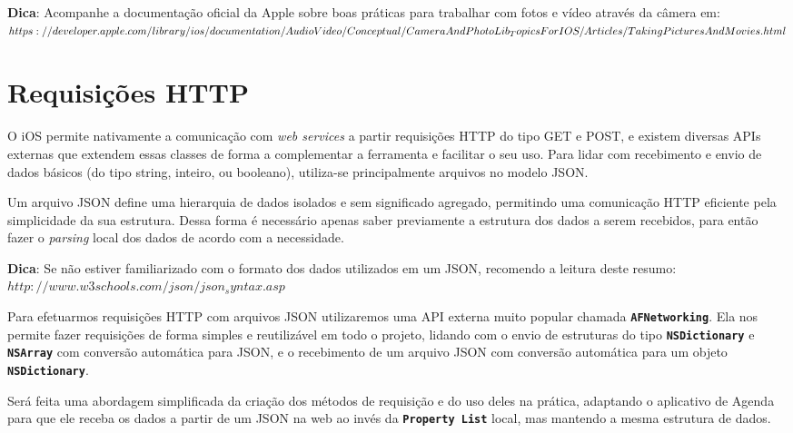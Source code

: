 \documentclass[a4paper,12pt,brazil,oneside]{book}
\begin{document}
\begin{framed}

\textbf{Dica}: Acompanhe a documentação oficial da Apple sobre boas práticas para trabalhar com fotos e vídeo através da câmera em:\\
\(https://developer.apple.com/library/ios/documentation/AudioVideo/Conceptual/\\CameraAndPhotoLib_TopicsForIOS/Articles/TakingPicturesAndMovies.html\)
\end{framed}


\section{Requisições HTTP}


O iOS permite nativamente a comunicação com \emph{web services} a partir requisições HTTP do tipo GET e POST, e existem diversas APIs externas que extendem essas classes de forma a complementar a ferramenta e facilitar o seu uso. Para lidar com recebimento e envio de dados básicos (do tipo string, inteiro, ou booleano), utiliza-se principalmente arquivos no modelo JSON.

Um arquivo JSON define uma hierarquia de dados isolados e sem significado agregado, permitindo uma comunicação HTTP eficiente pela simplicidade da sua estrutura. Dessa forma é necessário apenas saber previamente a estrutura dos dados a serem recebidos, para então fazer o \emph{parsing} local dos dados de acordo com a necessidade.

\begin{framed}

\textbf{Dica}:  Se não estiver familiarizado com o formato dos dados utilizados em um JSON, recomendo a leitura deste resumo:\\
\(http://www.w3schools.com/json/json_syntax.asp\)

\end{framed}



Para efetuarmos requisições HTTP com arquivos JSON utilizaremos uma API externa muito popular chamada \texttt{\textbf{AFNetworking}}. Ela nos permite fazer requisições de forma simples e reutilizável em todo o projeto, lidando com o envio de estruturas do tipo \texttt{\textbf{NSDictionary}} e \texttt{\textbf{NSArray}} com conversão automática para JSON, e o recebimento de um arquivo JSON com conversão automática para um objeto \texttt{\textbf{NSDictionary}}.

Será feita uma abordagem simplificada da criação dos métodos de requisição e do uso deles na prática, adaptando o aplicativo de Agenda para que ele receba os dados a partir de um JSON na web ao invés da \texttt{\textbf{Property List}} local, mas mantendo a mesma estrutura de dados.
\end{document}
